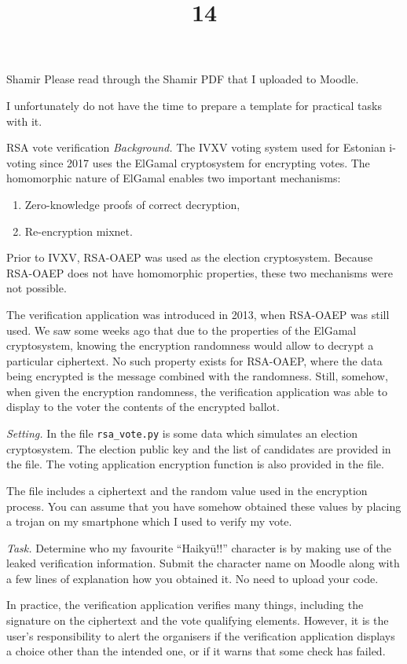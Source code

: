 \documentclass{practice}
\title{14}
\date{\DTMdisplaydate{2024}{12}{05}{4}}
\begin{document}
\maketitle

\begin{task}{Shamir}
  Please read through the Shamir PDF that I uploaded to Moodle.

  I unfortunately do not have the time to prepare a template for practical tasks with it.
\end{task}

\begin{task}{RSA vote verification}
  \textit{Background.}
  The IVXV voting system used for Estonian i-voting since 2017 uses the ElGamal cryptosystem for encrypting votes.
  The homomorphic nature of ElGamal enables two important mechanisms:
  \begin{enumerate}
    \item Zero-knowledge proofs of correct decryption,
    \item Re-encryption mixnet.
  \end{enumerate}
  Prior to IVXV, RSA-OAEP was used as the election cryptosystem.
  Because RSA-OAEP does not have homomorphic properties, these two mechanisms were not possible.

  The verification application was introduced in 2013, when RSA-OAEP was still used.
  We saw some weeks ago that due to the properties of the ElGamal cryptosystem, knowing the encryption randomness would allow to decrypt a particular ciphertext.
  No such property exists for RSA-OAEP, where the data being encrypted is the message combined with the randomness.
  Still, somehow, when given the encryption randomness, the verification application was able to display to the voter the contents of the encrypted ballot.

  \textit{Setting.}
  In the file \texttt{rsa\_vote.py} is some data which simulates an election cryptosystem.
  The election public key and the list of candidates are provided in the file.
  The voting application encryption function is also provided in the file.

  The file includes a ciphertext and the random value used in the encryption process.
  You can assume that you have somehow obtained these values by placing a trojan on my smartphone which I used to verify my vote.

  \textit{Task.}
  Determine who my favourite \enquote{Haikyū!!} character is by making use of the leaked verification information.
  Submit the character name on Moodle along with a few lines of explanation how you obtained it.
  No need to upload your code.

  \begin{tcolorbox}[title=NB!]
    In practice, the verification application verifies many things, including the signature on the ciphertext and the vote qualifying elements.
    However, it is the user's responsibility to alert the organisers if the verification application displays a choice other than the intended one, or if it warns that some check has failed.
  \end{tcolorbox}
\end{task}
\end{document}
